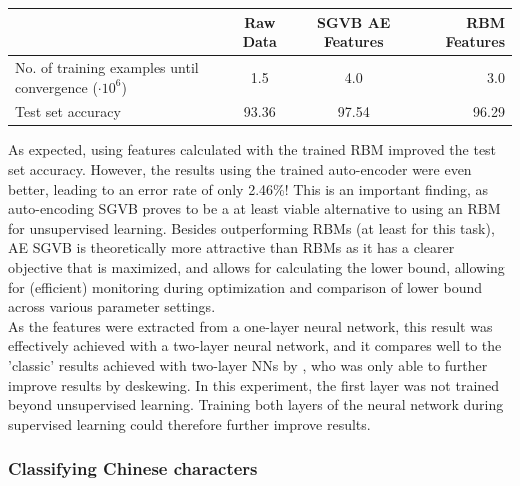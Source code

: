 \documentclass{article}
\begin{document}
\begin{table}
\begin{tabular}{|l|c|c|r|}
\hline
& Raw Data & SGVB AE Features & RBM Features \\ \hline
No. of training examples until convergence ($\cdot 10^6$) & 1.5 & 4.0 & 3.0 \\ \hline 
Test set accuracy & 93.36 & 97.54 & 96.29
\end{tabular}
\end{table}

As expected, using features calculated with the trained RBM improved the test set accuracy. However, the results using the trained auto-encoder were even better, leading to an error rate of only 2.46\%! This is an important finding, as auto-encoding SGVB proves to be a at least viable alternative to using an RBM for unsupervised learning. Besides outperforming RBMs (at least for this task), AE SGVB is theoretically more attractive than RBMs as it has a clearer objective that is maximized, and allows for calculating the lower bound, allowing for (efficient) monitoring during optimization and comparison  of lower bound across various parameter settings.\\
As the features were extracted from a one-layer neural network, this result was effectively achieved with a two-layer neural network, and it compares well to the 'classic' results achieved with two-layer NNs by \cite{lecun1998gradient}, who was only able to further improve results by deskewing. In this experiment, the first layer was not trained beyond unsupervised learning. Training both layers of the neural network during supervised learning could therefore further improve results.

\subsubsection{Classifying Chinese characters}
\end{document}

